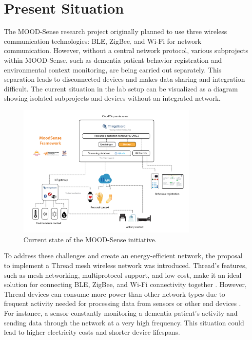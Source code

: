 \section{Present Situation}\label{sec:present_situation}
The MOOD-Sense research project originally planned to use three wireless communication technologies: \gls{BLE}, ZigBee, and Wi-Fi for network communication. However, without a central network protocol, various subprojects within MOOD-Sense, such as dementia patient behavior registration and environmental context monitoring, are being carried out separately. This separation leads to disconnected devices and makes data sharing and integration difficult. The current situation in the lab setup can be visualized as a diagram showing isolated subprojects and devices without an integrated network.

\begin{figure}[H]
    \centering
    \includegraphics[width=0.8\textwidth]{images/rationale/rationale_present_situation.png}
    \caption{Current state of the MOOD-Sense initiative.}
    \label{fig:rationale_present_situation}
\end{figure}

To address these challenges and create an energy-efficient network, the proposal to implement a Thread mesh wireless network was introduced. Thread's features, such as mesh networking, multiprotocol support, and low cost, make it an ideal solution for connecting \gls{BLE}, ZigBee, and Wi-Fi connectivity together \cite{Semiconductor_Nordic_Product_Brief_2018_2.0}. However, Thread devices can consume more power than other network types due to frequent activity needed for processing data from sensors or other end devices \cite{semiconductor_battery_2021}. For instance, a sensor constantly monitoring a dementia patient's activity and sending data through the network at a very high frequency. This situation could lead to higher electricity costs and shorter device lifespans.

